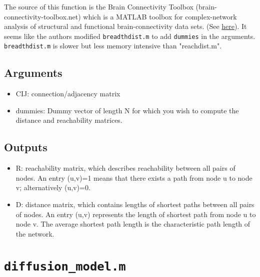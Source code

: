 \documentclass[10pt,letterpaper]{article}
\begin{document}
The source of this function is the Brain Connectivity Toolbox (brain-connectivity-toolbox.net) which is a MATLAB toolbox for complex-network analysis of structural and functional brain-connectivity data sets. (See \href{https://sites.google.com/site/bctnet/}{here}). It seems like the authors modified \texttt{breadthdist.m} to add \texttt{dummies} in the arguments. \texttt{breadthdist.m} is slower but less memory intensive than "reachdist.m".

\subsection*{Arguments}
\begin{itemize}
	\item CIJ: connection/adjacency matrix
	\item dummies: Dummy vector of length N for which you wish to compute the distance and reachability matrices.
\end{itemize}

\subsection*{Outputs}
\begin{itemize}
	\item R: reachability matrix, which describes reachability between all pairs of nodes. An entry (u,v)=1 means that there exists a path from node u to node v; alternatively (u,v)=0.
	\item D: distance matrix, which contains lengths of shortest paths between all pairs of nodes. An entry (u,v) represents the length of shortest path from node u to  node v. The average shortest path length is the characteristic path length of the network.
\end{itemize}

\section{\texttt{diffusion\_model.m}}\label{diffusion_model}

\clearpage
%
%
\end{document}
